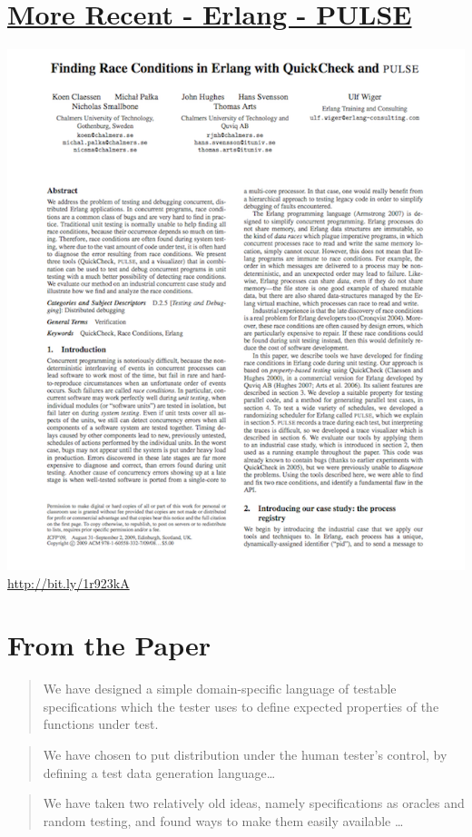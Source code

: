 \documentclass[11pt]{article}
\begin{document}
\section{\href{http://www.cse.chalmers.se/~nicsma/papers/finding-race-conditions.pdf}{More Recent - Erlang - PULSE}}
\label{sec-10}

\includegraphics[width=.9\linewidth]{../images/qc_cond_go.png}
\url{http://bit.ly/1r923kA}
\section{From the Paper}
\label{sec-11}
\begin{quote}
We have designed a simple domain-specific language of
testable specifications which the tester uses to
define expected properties of the functions under test.
\end{quote}
\begin{quote}
We have chosen to put distribution under the human tester's
control, by defining a test data generation language\ldots{}
\end{quote}
\begin{quote}
We have taken two relatively old ideas, namely specifications
as oracles and random testing, and found ways to make them
easily available \ldots{}
\end{quote}
\end{document}
